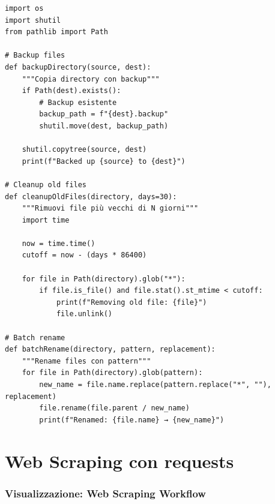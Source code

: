 \begin{lstlisting}
import os
import shutil
from pathlib import Path

# Backup files
def backupDirectory(source, dest):
    """Copia directory con backup"""
    if Path(dest).exists():
        # Backup esistente
        backup_path = f"{dest}.backup"
        shutil.move(dest, backup_path)

    shutil.copytree(source, dest)
    print(f"Backed up {source} to {dest}")

# Cleanup old files
def cleanupOldFiles(directory, days=30):
    """Rimuovi file più vecchi di N giorni"""
    import time

    now = time.time()
    cutoff = now - (days * 86400)

    for file in Path(directory).glob("*"):
        if file.is_file() and file.stat().st_mtime < cutoff:
            print(f"Removing old file: {file}")
            file.unlink()

# Batch rename
def batchRename(directory, pattern, replacement):
    """Rename files con pattern"""
    for file in Path(directory).glob(pattern):
        new_name = file.name.replace(pattern.replace("*", ""), replacement)
        file.rename(file.parent / new_name)
        print(f"Renamed: {file.name} → {new_name}")
\end{lstlisting}

\section{Web Scraping con requests}

\subsubsection{Visualizzazione: Web Scraping Workflow}


